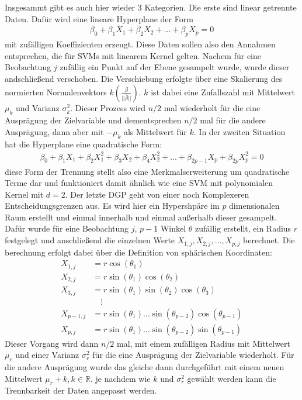 \documentclass[
]{article}
\begin{document}
Insgesammt gibt es auch hier wieder 3 Kategorien. Die erste sind linear
getrennte Daten. Dafür wird eine lineare Hyperplane der Form
\begin{align*}
\beta_0+\beta_1 X_1+\beta_2 X_2 +...+\beta_p X_p=0
\end{align*} mit zufälligen Koeffizienten erzeugt. Diese Daten sollen
also den Annahmen entsprechen, die für SVMs mit linearem Kernel gelten.
Nachem für eine Beobachtung \(j\) zufällig ein Punkt auf der Ebene
gesampelt wurde, wurde dieser andschließend verschoben. Die Verschiebung
erfolgte über eine Skalierung des normierten Normalenvektors
\(k\left(\frac{\overline{\beta}}{||\overline{\beta}||}\right)\). \(k\)
ist dabei eine Zufallszahl mit Mittelwert \(\mu_k\) und Varianz
\(\sigma^2_k\). Dieser Prozess wird \(n/2\) mal wiederholt für die eine
Ausprägung der Zielvariable und dementsprechen \(n/2\) mal für die
andere Ausprägung, dann aber mit \(-\mu_k\) als Mittelwert für \(k\).
\newline In der zweiten Situation hat die Hyperplane eine quadratische
Form: \begin{align*}
\beta_0+\beta_1 X_1 + \beta_2 X_1^2+\beta_3 X_2+\beta_4 X_2^2+...+\beta_{2p-1}X_p+\beta_{2p}X_p^2=0
\end{align*} diese Form der Trennung stellt also eine
Merkmalserweiterung um quadratische Terme dar und funktioniert damit
ähnlich wie eine SVM mit polynomialen Kernel mit \(d=2\). Der letzte DGP
geht von einer noch Komplexeren Entscheidungsgrenzen aus. Es wird hier
ein Hypershpäre im \(p\) dimensionalen Raum erstellt und einmal
innerhalb und einmal außerhalb dieser gesampelt. Dafür wurde für eine
Beobachtung \(j\), \(p-1\) Winkel \(\theta\) zufällig erstellt, ein
Radius \(r\) festgelegt und anschließend die einzelnen Werte
\(X_{1,j},X_{2,j},...,X_{p,j}\) berechnet. Die berechnung erfolgt dabei
über die Definition von sphärischen Koordinaten: \begin{align*}
        X_{1,j} &= r \cos(\theta_1)\\
        X_{2,j} &= r \sin(\theta_1)\cos(\theta_2)\\
        X_{3,j} &= r \sin(\theta_1)\sin(\theta_2)\cos(\theta_3)\\
        &\quad \vdots\\
        X_{p-1,j}&=r \sin(\theta_1)\ldots \sin(\theta_{p-2})\cos(\theta_{p-1})\\
        X_{p,j}&=r \sin(\theta_1)\ldots \sin(\theta_{p-2})\sin(\theta_{p-1})
    \end{align*} Dieser Vorgang wird dann \(n/2\) mal, mit einem
zufälligen Radius mit Mittelwert \(\mu_r\) und einer Varianz
\(\sigma^2_r\) für die eine Ausprägung der Zielvariable wiederholt. Für
die andere Ausprägung wurde das gleiche dann durchgeführt mit einem
neuen Mittelwert \(\mu_r+k,k\in \mathbb{R}\). je nachdem wie \(k\) und
\(\sigma^2_r\) gewählt werden kann die Trennbarkeit der Daten angepasst
werden.
\end{document}
